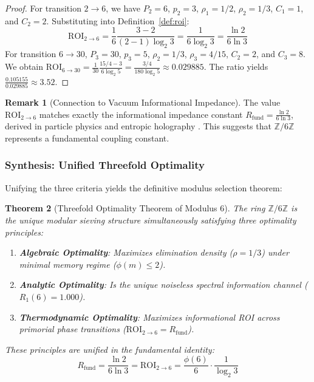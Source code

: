 \documentclass{article}
\numberwithin{equation}{section}
\theoremstyle{plain}
\newtheorem{theorem}{Theorem}[section]
\theoremstyle{definition}
\newtheorem{remark}[theorem]{Remark}
\begin{document}
\begin{proof}
For transition $2 \to 6$, we have $P_2 = 6$, $p_2 = 3$, $\rho_1 = 1/2$, $\rho_2 = 1/3$, $C_1 = 1$, and $C_2 = 2$. Substituting into Definition~\ref{def:roi}:
\begin{equation}
\mathrm{ROI}_{2 \to 6} = \frac{1}{6} \frac{3 - 2}{(2 - 1) \log_2 3} = \frac{1}{6 \log_2 3} = \frac{\ln 2}{6 \ln 3}
\end{equation}
For transition $6 \to 30$, $P_3 = 30$, $p_3 = 5$, $\rho_2 = 1/3$, $\rho_3 = 4/15$, $C_2 = 2$, and $C_3 = 8$. We obtain $\mathrm{ROI}_{6 \to 30} = \frac{1}{30} \frac{15/4 - 3}{6 \log_2 5} = \frac{3/4}{180 \log_2 5} \approx 0.029885$. The ratio yields $\frac{0.105155}{0.029885} \approx 3.52$.
\end{proof}

\begin{remark}[Connection to Vacuum Informational Impedance]
\label{rem:rfund-identity}
The value $\mathrm{ROI}_{2 \to 6}$ matches exactly the informational impedance constant $R_{\text{fund}} = \frac{\ln 2}{6 \ln 3}$, derived in particle physics and entropic holography \cite{Peinador2026RiemannGUE}. This suggests that $\mathbb{Z}/6\mathbb{Z}$ represents a fundamental coupling constant.
\end{remark}

\subsubsection{Synthesis: Unified Threefold Optimality}

Unifying the three criteria yields the definitive modulus selection theorem:

\begin{theorem}[Threefold Optimality Theorem of Modulus 6]
\label{thm:triple-optimalidad}
The ring $\mathbb{Z}/6\mathbb{Z}$ is the unique modular sieving structure simultaneously satisfying three optimality principles:
\begin{enumerate}
    \item \textbf{Algebraic Optimality}: Maximizes elimination density ($\rho = 1/3$) under minimal memory regime ($\phi(m) \le 2$).
    \item \textbf{Analytic Optimality}: Is the unique noiseless spectral information channel ($R_1(6) = 1.000$).
    \item \textbf{Thermodynamic Optimality}: Maximizes informational ROI across primorial phase transitions ($\mathrm{ROI}_{2 \to 6} = R_{\text{fund}}$).
\end{enumerate}
These principles are unified in the fundamental identity:
\begin{equation}
\boxed{
R_{\text{fund}} = \frac{\ln 2}{6\ln 3} = \mathrm{ROI}_{2\to6} = \frac{\phi(6)}{6} \cdot \frac{1}{\log_2 3}
}
\end{equation}
\end{theorem}
\end{document}
